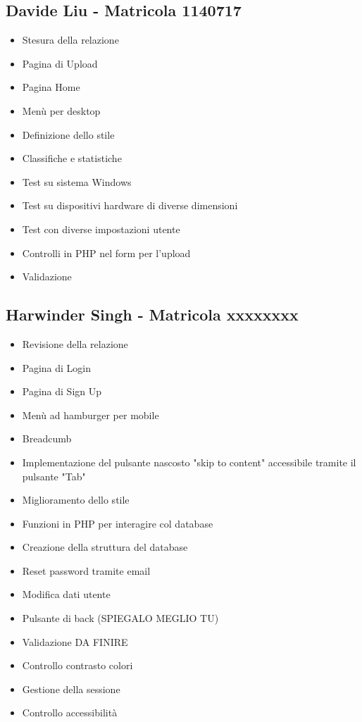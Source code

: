 \documentclass[openany, a4paper, 12pt]{report}
\begin{document}
	\subsection{Davide Liu - Matricola 1140717}
	\begin{itemize}
		\item Stesura della relazione
		\item Pagina di Upload
		\item Pagina Home
		\item Menù per desktop
		\item Definizione dello stile
		\item Classifiche e statistiche
		\item Test su sistema Windows
		\item Test su dispositivi hardware di diverse
		 dimensioni
		\item Test con diverse impostazioni utente
		\item Controlli in PHP nel form per l'upload
		\item Validazione
	\end{itemize}
	\subsection{Harwinder Singh - Matricola xxxxxxxx}
	\begin{itemize}
		\item Revisione della relazione
		\item Pagina di Login
		\item Pagina di Sign Up
		\item Menù ad hamburger per mobile
		\item Breadcumb
		\item Implementazione del pulsante nascosto "skip to content" accessibile tramite il pulsante "Tab" 
		\item Miglioramento dello stile
		\item Funzioni in PHP per interagire col database
		\item Creazione della struttura del database
		\item Reset password tramite email
		\item Modifica dati utente
		\item Pulsante di back (SPIEGALO MEGLIO TU)
		\item Validazione DA FINIRE
		\item Controllo contrasto colori
		\item Gestione della sessione
		\item Controllo accessibilità
	\end{itemize}
\end{document}
